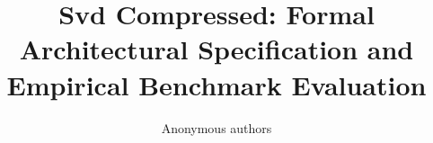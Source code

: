 \title{\textbf{Svd Compressed: Formal Architectural Specification and Empirical Benchmark Evaluation}}

\author{Anonymous authors}
